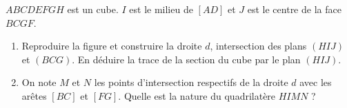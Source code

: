 
\begin{minipage}{8cm}


$ABCDEFGH$ est un cube. $I$ est le milieu de $[AD]$ et $J$ est le centre de la face $BCGF$.
\begin{enumerate}
\item Reproduire la figure et construire la droite $d$, intersection des plans $(HIJ)$ et $(BCG)$. En déduire la trace de la section du cube par le plan $(HIJ)$.
\item On note $M$ et $N$ les points d'intersection respectifs de la droite $d$ avec les arêtes $[BC]$ et $[FG]$. Quelle est la nature du quadrilatère $HIMN$ ?
\end{enumerate}

\end{minipage}
\begin{minipage}{8cm}


\end{minipage}
